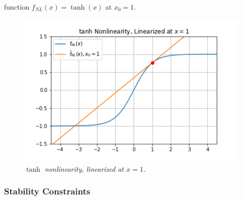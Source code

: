 \documentclass[twoside,a4paper]{article}
\begin{document}
function $f_{NL}(x) = \tanh(x)$ at $x_0=1$.
%
\begin{figure}[h]
    \center
    \includegraphics[width=\linewidth]{../Pics/tanh_linized.png}
    \caption{\label{tanh_lin}{\it $\tanh$ nonlinearity, linearized at $x=1$.}}
\end{figure}
%
\subsubsection{Stability Constraints}
\end{document}
